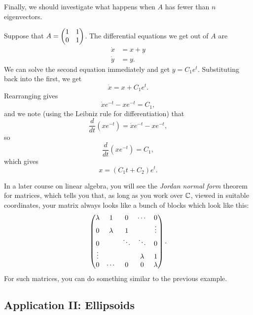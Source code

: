 \documentclass{article}
\begin{document}
Finally, we should investigate what happens when \(A\) has fewer
than \(n\) eigenvectors.


\begin{Example}
Suppose that \(A=\begin{pmatrix} 1 & 1 \\ 0 & 1\end{pmatrix}\). The differential equations
we get out of \(A\) are
\begin{align*}
\dot{x}&=x+y\\
\dot{y}&=y.
\end{align*}
We can solve the second equation immediately and get
\(y=C_1e^{t}\). Substituting back into the first, we get
\[\dot{x}=x+C_1e^t.\] Rearranging gives
\[\dot{x}e^{-t}-xe^{-t}=C_1,\] and we note (using the Leibniz rule
for differentiation) that
\[\frac{d}{dt}(xe^{-t})=\dot{x}e^{-t}-xe^{-t},\] so
\[\frac{d}{dt}(xe^{-t})=C_1,\] which gives \[x=(C_1t+C_2)e^t.\]


\end{Example}
In a later course on linear algebra, you will see the {\em Jordan
normal form} theorem for matrices, which tells you that, as long as
you work over \(\mathbb{C}\), viewed in suitable coordinates, your matrix
always looks like a bunch of blocks which look like this: \[\begin{pmatrix}
\lambda & 1 & 0 & \cdots & 0 \\ 0 & \lambda & 1 & &\vdots \\ 0&
&\ddots &\ddots & 0\\ \vdots & & & \lambda & 1 \\ 0 & \cdots &0 &0 &
\lambda\end{pmatrix}.\] For such matrices, you can do something similar to the
previous example.


\subsection{Application II: Ellipsoids}
\end{document}

